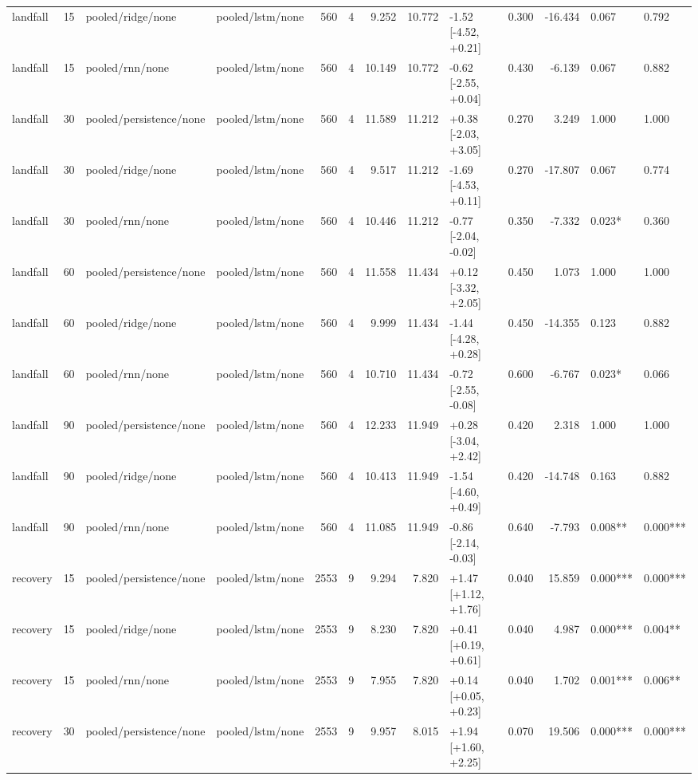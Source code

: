\begin{tabular}{lrllrrrrlrrll}
landfall & 15 & pooled/ridge/none & pooled/lstm/none & 560 & 4 & 9.252 & 10.772 & -1.52 [-4.52, +0.21] & 0.300 & -16.434 & 0.067 & 0.792 \\
landfall & 15 & pooled/rnn/none & pooled/lstm/none & 560 & 4 & 10.149 & 10.772 & -0.62 [-2.55, +0.04] & 0.430 & -6.139 & 0.067 & 0.882 \\
landfall & 30 & pooled/persistence/none & pooled/lstm/none & 560 & 4 & 11.589 & 11.212 & +0.38 [-2.03, +3.05] & 0.270 & 3.249 & 1.000 & 1.000 \\
landfall & 30 & pooled/ridge/none & pooled/lstm/none & 560 & 4 & 9.517 & 11.212 & -1.69 [-4.53, +0.11] & 0.270 & -17.807 & 0.067 & 0.774 \\
landfall & 30 & pooled/rnn/none & pooled/lstm/none & 560 & 4 & 10.446 & 11.212 & -0.77 [-2.04, -0.02] & 0.350 & -7.332 & 0.023* & 0.360 \\
landfall & 60 & pooled/persistence/none & pooled/lstm/none & 560 & 4 & 11.558 & 11.434 & +0.12 [-3.32, +2.05] & 0.450 & 1.073 & 1.000 & 1.000 \\
landfall & 60 & pooled/ridge/none & pooled/lstm/none & 560 & 4 & 9.999 & 11.434 & -1.44 [-4.28, +0.28] & 0.450 & -14.355 & 0.123 & 0.882 \\
landfall & 60 & pooled/rnn/none & pooled/lstm/none & 560 & 4 & 10.710 & 11.434 & -0.72 [-2.55, -0.08] & 0.600 & -6.767 & 0.023* & 0.066 \\
landfall & 90 & pooled/persistence/none & pooled/lstm/none & 560 & 4 & 12.233 & 11.949 & +0.28 [-3.04, +2.42] & 0.420 & 2.318 & 1.000 & 1.000 \\
landfall & 90 & pooled/ridge/none & pooled/lstm/none & 560 & 4 & 10.413 & 11.949 & -1.54 [-4.60, +0.49] & 0.420 & -14.748 & 0.163 & 0.882 \\
landfall & 90 & pooled/rnn/none & pooled/lstm/none & 560 & 4 & 11.085 & 11.949 & -0.86 [-2.14, -0.03] & 0.640 & -7.793 & 0.008** & 0.000*** \\
recovery & 15 & pooled/persistence/none & pooled/lstm/none & 2553 & 9 & 9.294 & 7.820 & +1.47 [+1.12, +1.76] & 0.040 & 15.859 & 0.000*** & 0.000*** \\
recovery & 15 & pooled/ridge/none & pooled/lstm/none & 2553 & 9 & 8.230 & 7.820 & +0.41 [+0.19, +0.61] & 0.040 & 4.987 & 0.000*** & 0.004** \\
recovery & 15 & pooled/rnn/none & pooled/lstm/none & 2553 & 9 & 7.955 & 7.820 & +0.14 [+0.05, +0.23] & 0.040 & 1.702 & 0.001*** & 0.006** \\
recovery & 30 & pooled/persistence/none & pooled/lstm/none & 2553 & 9 & 9.957 & 8.015 & +1.94 [+1.60, +2.25] & 0.070 & 19.506 & 0.000*** & 0.000*** \\

\end{tabular}
